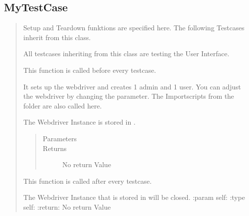 \documentclass[letterpaper,10pt,english]{sphinxmanual}
\begin{document}
\subsection{MyTestCase}
\label{\detokenize{masterCodeDoc:mytestcase}}\begin{quote}


\begin{fulllineitems}
Setup and Teardown funktions are specified here.
The following Testcases inherit from this class.

All testcases inheriting from this class are testing the User Interface.


\begin{fulllineitems}
This function is called before every testcase.

It sets up the webdriver and creates 1 admin and 1 user.
You can adjust the webdriver by changing the  parameter.
The Importscripts from the folder  are also called here.

The Webdriver Instance is stored in .
\begin{quote}\begin{description}
\item[{Parameters}] \leavevmode
{} \textendash{} 

\item[{Returns}] \leavevmode
No return Value

\end{description}\end{quote}

\end{fulllineitems}



\begin{fulllineitems}
This function is called after every testcase.

The Webdriver Instance that is stored in  will be closed.
:param self:
:type self:
:return: No return Value

\end{fulllineitems}


\end{fulllineitems}

\end{quote}
\end{document}
